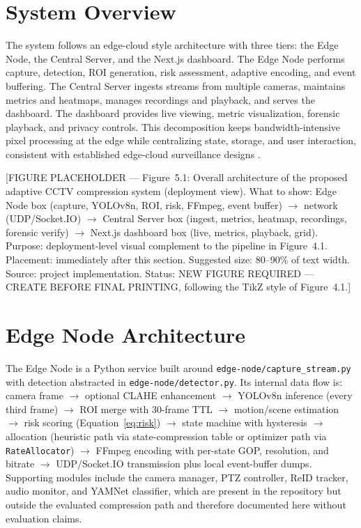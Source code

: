 \section{System Overview}

The system follows an edge-cloud style architecture with three tiers: the Edge Node, the Central Server, and the Next.js dashboard. The Edge Node performs capture, detection, ROI generation, risk assessment, adaptive encoding, and event buffering. The Central Server ingests streams from multiple cameras, maintains metrics and heatmaps, manages recordings and playback, and serves the dashboard. The dashboard provides live viewing, metric visualization, forensic playback, and privacy controls. This decomposition keeps bandwidth-intensive pixel processing at the edge while centralizing state, storage, and user interaction, consistent with established edge-cloud surveillance designs \cite{Chen2019DIVS,Elgamal2020SIEVE,Nan2023Collaborative}.

[FIGURE PLACEHOLDER --- Figure~5.1: Overall architecture of the proposed adaptive CCTV compression system (deployment view). What to show: Edge Node box (capture, YOLOv8n, ROI, risk, FFmpeg, event buffer) $\rightarrow$ network (UDP/Socket.IO) $\rightarrow$ Central Server box (ingest, metrics, heatmap, recordings, forensic verify) $\rightarrow$ Next.js dashboard box (live, metrics, playback, grid). Purpose: deployment-level visual complement to the pipeline in Figure~4.1. Placement: immediately after this section. Suggested size: 80--90\% of text width. Source: project implementation. Status: NEW FIGURE REQUIRED --- CREATE BEFORE FINAL PRINTING, following the TikZ style of Figure~4.1.]

\section{Edge Node Architecture}

The Edge Node is a Python service built around \texttt{edge-node/capture\_stream.py} with detection abstracted in \texttt{edge-node/detector.py}. Its internal data flow is: camera frame $\rightarrow$ optional CLAHE enhancement $\rightarrow$ YOLOv8n inference (every third frame) $\rightarrow$ ROI merge with 30-frame TTL $\rightarrow$ motion/scene estimation $\rightarrow$ risk scoring (Equation~\ref{eq:risk}) $\rightarrow$ state machine with hysteresis $\rightarrow$ allocation (heuristic path via state-compression table or optimizer path via \texttt{RateAllocator}) $\rightarrow$ FFmpeg encoding with per-state GOP, resolution, and bitrate $\rightarrow$ UDP/Socket.IO transmission plus local event-buffer dumps. Supporting modules include the camera manager, PTZ controller, ReID tracker, audio monitor, and YAMNet classifier, which are present in the repository but outside the evaluated compression path and therefore documented here without evaluation claims.

